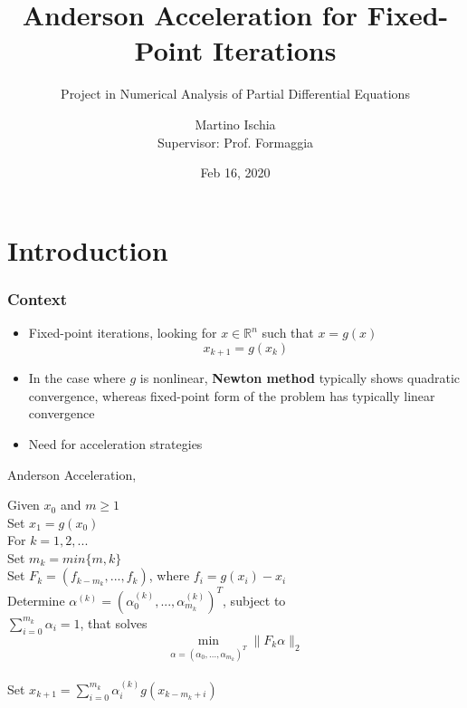 \documentclass{beamer}
\title[Anderson Acceleration]{Anderson Acceleration for Fixed-Point Iterations}
\subtitle {Project in Numerical Analysis of Partial Differential Equations}
\author[Martino Ischia]{Martino Ischia\\ \footnotesize{Supervisor: Prof. Formaggia}}
\institute[]
		{
		Politecnico di Milano
		}
\date{Feb 16, 2020}
\begin{document}
			\begin{frame}
				\titlepage 
			\end{frame}
				
			\section{Introduction}
				\begin{frame}
					\frametitle{Context}
					\begin{itemize}
						\item Fixed-point iterations, looking for $x\in\mathbb{R}^n$ such that $x=g(x)$
						$$x_{k+1} = g(x_k)$$
						\item In the case where $g$ is nonlinear, \textbf{Newton method} typically shows quadratic convergence,
						whereas fixed-point form of the problem has typically linear convergence
						\item  Need for acceleration strategies
					\end{itemize}    
				\end{frame}
				
				
				\begin{frame}{Anderson Acceleration, \citeyear{Anderson} \cite{Anderson}}
					
					Given $x_0$ and $m \geq 1$\\
					Set $x_1 = g(x_0)$\\
					For $k = 1, 2, ...$\\
					\hspace*{16pt} Set $m_k = min\{m, k\}$\\
					\hspace*{20pt}Set $F_k = (f_{k-m_k}, ... , f_k)$, where $f_i = g(x_i)-x_{i}$\\
					\hspace*{20pt}Determine $\alpha^{(k)} = (\alpha^{(k)}
					_0 , ..., \alpha^{(k)}_{m_k} )^T$, subject to\\ \hspace*{20pt}$\sum^{m_k}_{i=0} {\alpha_i = 1}$, that solves
					$$\min_{\alpha=(\alpha_0,...,\alpha_{m_k} )^T} \|F_k \alpha\|_2$$\\
					\hspace*{20pt}Set $x_{k+1} =\sum^{m_k}
					_{i=0} {\alpha_i^{(k)} g(x_{k-m_{k}+i})}$    
				\end{frame}
				
\end{document}
